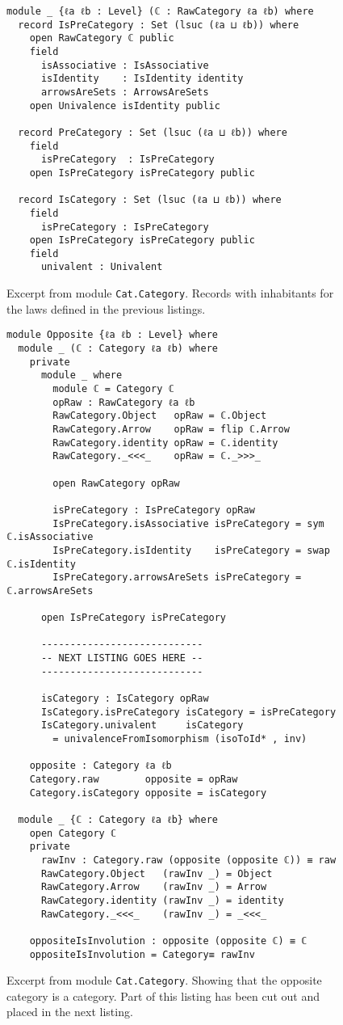 \begin{figure}[h]
\begin{Verbatim}
module _ {ℓa ℓb : Level} (ℂ : RawCategory ℓa ℓb) where
  record IsPreCategory : Set (lsuc (ℓa ⊔ ℓb)) where
    open RawCategory ℂ public
    field
      isAssociative : IsAssociative
      isIdentity    : IsIdentity identity
      arrowsAreSets : ArrowsAreSets
    open Univalence isIdentity public

  record PreCategory : Set (lsuc (ℓa ⊔ ℓb)) where
    field
      isPreCategory  : IsPreCategory
    open IsPreCategory isPreCategory public

  record IsCategory : Set (lsuc (ℓa ⊔ ℓb)) where
    field
      isPreCategory : IsPreCategory
    open IsPreCategory isPreCategory public
    field
      univalent : Univalent
\end{Verbatim}
\caption{Excerpt from module \texttt{Cat.Category}. Records with inhabitants for
  the laws defined in the previous listings.}
\end{figure}
\clearpage
\begin{figure}[h]
\begin{Verbatim}
module Opposite {ℓa ℓb : Level} where
  module _ (ℂ : Category ℓa ℓb) where
    private
      module _ where
        module ℂ = Category ℂ
        opRaw : RawCategory ℓa ℓb
        RawCategory.Object   opRaw = ℂ.Object
        RawCategory.Arrow    opRaw = flip ℂ.Arrow
        RawCategory.identity opRaw = ℂ.identity
        RawCategory._<<<_    opRaw = ℂ._>>>_

        open RawCategory opRaw

        isPreCategory : IsPreCategory opRaw
        IsPreCategory.isAssociative isPreCategory = sym ℂ.isAssociative
        IsPreCategory.isIdentity    isPreCategory = swap ℂ.isIdentity
        IsPreCategory.arrowsAreSets isPreCategory = ℂ.arrowsAreSets

      open IsPreCategory isPreCategory

      ----------------------------
      -- NEXT LISTING GOES HERE --
      ----------------------------

      isCategory : IsCategory opRaw
      IsCategory.isPreCategory isCategory = isPreCategory
      IsCategory.univalent     isCategory
        = univalenceFromIsomorphism (isoToId* , inv)

    opposite : Category ℓa ℓb
    Category.raw        opposite = opRaw
    Category.isCategory opposite = isCategory

  module _ {ℂ : Category ℓa ℓb} where
    open Category ℂ
    private
      rawInv : Category.raw (opposite (opposite ℂ)) ≡ raw
      RawCategory.Object   (rawInv _) = Object
      RawCategory.Arrow    (rawInv _) = Arrow
      RawCategory.identity (rawInv _) = identity
      RawCategory._<<<_    (rawInv _) = _<<<_

    oppositeIsInvolution : opposite (opposite ℂ) ≡ ℂ
    oppositeIsInvolution = Category≡ rawInv
\end{Verbatim}
\caption{Excerpt from module \texttt{Cat.Category}. Showing that the opposite
  category is a category. Part of this listing has been cut out and placed in
  the next listing.}
\end{figure}
